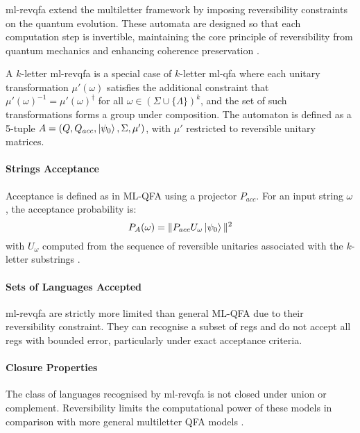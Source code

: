 \subsubsection{}
\gls{ml-revqfa} extend the multiletter framework by imposing reversibility constraints on the quantum evolution. These automata are designed so that each computation step is invertible, maintaining the core principle of reversibility from quantum mechanics and enhancing coherence preservation \cite{belovs2007multi}.

\begin{definition}
A $k$-letter \gls{ml-revqfa} is a special case of $k$-letter \gls{ml-qfa} where each unitary transformation $\mu'(\omega)$ satisfies the additional constraint that $\mu'(\omega)^{-1} = \mu'(\omega)^\dagger$ for all $\omega \in (\Sigma \cup \{\Lambda\})^k$, and the set of such transformations forms a group under composition.
The automaton is defined as a 5-tuple $A = (Q, Q_{acc}, \ket{\psi_0}, \Sigma, \mu')$, with $\mu'$ restricted to reversible unitary matrices.
\end{definition}

\paragraph{Strings Acceptance}
Acceptance is defined as in ML-QFA using a projector $P_{acc}$. For an input string $\omega$, the acceptance probability is:
\[
P_A(\omega) = \| P_{acc} U_{\omega} \ket{\psi_0} \|^2
\]
with $U_{\omega}$ computed from the sequence of reversible unitaries associated with the $k$-letter substrings \cite{belovs2007multi}.

\paragraph{Sets of Languages Accepted}
\gls{ml-revqfa} are strictly more limited than general ML-QFA due to their reversibility constraint. They can recognise a subset of \glspl{reg} and do not accept all \glspl{reg} with bounded error, particularly under exact acceptance criteria.

\paragraph{Closure Properties}
The class of languages recognised by \gls{ml-revqfa} is not closed under union or complement. Reversibility limits the computational power of these models in comparison with more general multiletter QFA models \cite{belovs2007multi}.

